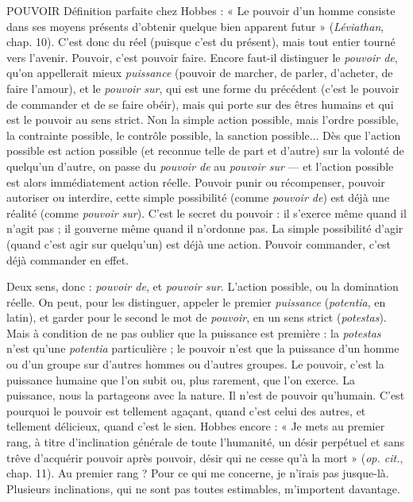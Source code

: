 POUVOIR Définition parfaite chez Hobbes : « Le pouvoir d’un homme
consiste dans ses moyens présents d’obtenir quelque bien apparent
futur » ({\it Léviathan}, chap. 10). C’est donc du réel (puisque c’est du présent),
mais tout entier tourné vers l'avenir. Pouvoir, c’est pouvoir faire. Encore
faut-il distinguer le {\it pouvoir de}, qu’on appellerait mieux {\it puissance} (pouvoir de
marcher, de parler, d’acheter, de faire l'amour), et le {\it pouvoir sur}, qui est une
forme du précédent (c’est le pouvoir de commander et de se faire obéir), mais
qui porte sur des êtres humains et qui est le pouvoir au sens strict. Non la
simple action possible, mais l’ordre possible, la contrainte possible, le contrôle
possible, la sanction possible... Dès que l’action possible est action possible (et
reconnue telle de part et d’autre) sur la volonté de quelqu'un d’autre, on passe
du {\it pouvoir de} au {\it pouvoir sur} — et l’action possible est alors immédiatement
action réelle. Pouvoir punir ou récompenser, pouvoir autoriser ou interdire,
cette simple possibilité (comme {\it pouvoir de}) est déjà une réalité (comme {\it pouvoir
sur}). C’est le secret du pouvoir : il s'exerce même quand il n’agit pas ; il gouverne
même quand il n’ordonne pas. La simple possibilité d’agir (quand c’est
agir sur quelqu'un) est déjà une action. Pouvoir commander, c’est déjà commander
en effet.

Deux sens, donc : {\it pouvoir de}, et {\it pouvoir sur}. L'action possible, ou la domination
réelle. On peut, pour les distinguer, appeler le premier {\it puissance}
({\it potentia}, en latin), et garder pour le second le mot de {\it pouvoir}, en un sens strict
({\it potestas}). Mais à condition de ne pas oublier que la puissance est première : la
{\it potestas} n'est qu'une {\it potentia} particulière ; le pouvoir n’est que la puissance
d'un homme ou d’un groupe sur d’autres hommes ou d’autres groupes. Le
pouvoir, c’est la puissance humaine que l’on subit ou, plus rarement, que l'on
exerce. La puissance, nous la partageons avec la nature. Il n’est de pouvoir
qu’humain. C’est pourquoi le pouvoir est tellement agaçant, quand c’est celui
des autres, et tellement délicieux, quand c’est le sien. Hobbes encore : « Je
mets au premier rang, à titre d’inclination générale de toute l'humanité, un
désir perpétuel et sans trêve d’acquérir pouvoir après pouvoir, désir qui ne cesse
qu’à la mort » ({\it op. cit.}, chap. 11). Au premier rang ? Pour ce qui me concerne,
je n’irais pas jusque-là. Plusieurs inclinations, qui ne sont pas toutes estimables,
m'importent davantage.

